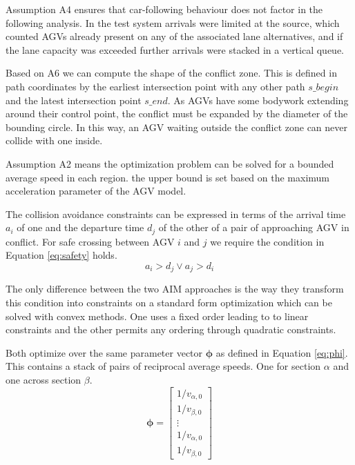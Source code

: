 \documentclass[11pt]{article} %
\begin{document}
Assumption A4 ensures that car-following behaviour does not factor in the following analysis. In the test system arrivals were limited at the source, which counted AGVs already present on any of the associated lane alternatives, and if the lane capacity was exceeded further arrivals were stacked in a vertical queue.    

Based on A6 we can compute the shape of the conflict zone. This is defined in path coordinates by the earliest intersection point with any other path $s\_begin$ and the latest intersection point $s\_end$. As AGVs have some bodywork extending around their control point, the conflict must be expanded by the diameter of the bounding circle. In this way, an AGV waiting outside the conflict zone can never collide with one inside. 

Assumption A2 means the optimization problem can  be solved for a bounded average speed in each region. the upper bound is set based on the maximum acceleration parameter of the AGV model.

The collision avoidance constraints can be expressed in terms of the arrival time $a_i$ of one and the departure time $d_j$ of the other of a pair of approaching AGV in conflict. For safe crossing between AGV $i$ and $j$ we require the condition in Equation \ref{eq:safety}  holds.
\begin{equation}
\label{eq:safety}
a_i > d_j \lor a_j > d_i
\end{equation}

The only difference between the two AIM approaches is the way they transform this condition into constraints on a standard form optimization which can be solved with convex methods. One uses a fixed order leading to to linear constraints and the other permits any ordering through quadratic constraints. 

Both optimize over the same parameter vector $\bm{\phi}$ as defined in Equation \ref{eq:phi}. This contains a stack of pairs of reciprocal average speeds. One for section $\alpha$ and one across section $\beta$.
\begin{equation}
\label{eq:phi}
\bm{\phi} = \left[\begin{array}{c}
	1/v_{\alpha,0} \\
	1/v_{\beta,0} \\
	\vdots \\
	1/v_{\alpha,0} \\
	1/v_{\beta,0}
\end{array}\right]
\end{equation}   
\end{document}
